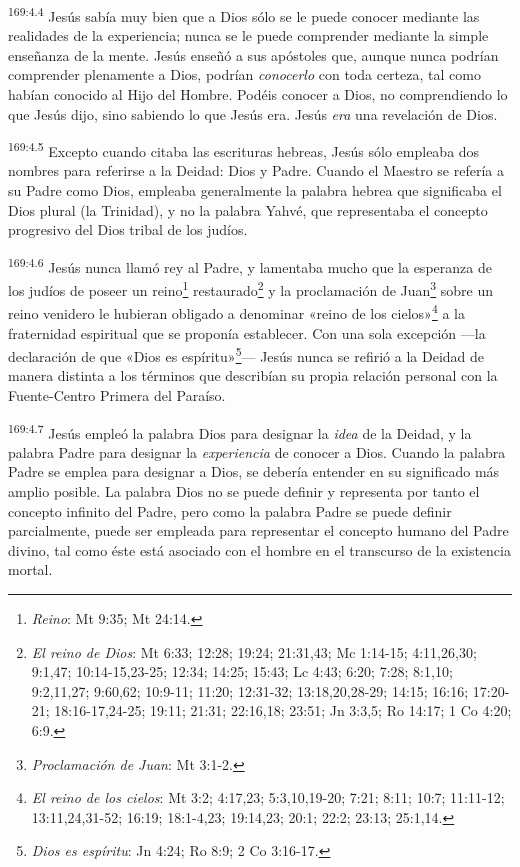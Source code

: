 \par
\textsuperscript{169:4.4} Jesús sabía muy bien que a Dios sólo se le puede conocer mediante las realidades de la experiencia; nunca se le puede comprender mediante la simple enseñanza de la mente. Jesús enseñó a sus apóstoles que, aunque nunca podrían comprender plenamente a Dios, podrían \textit{conocerlo} con toda certeza, tal como habían conocido al Hijo del Hombre. Podéis conocer a Dios, no comprendiendo lo que Jesús dijo, sino sabiendo lo que Jesús era. Jesús \textit{era} una revelación de Dios.

\par
\textsuperscript{169:4.5} Excepto cuando citaba las escrituras hebreas, Jesús sólo empleaba dos nombres para referirse a la Deidad: Dios y Padre. Cuando el Maestro se refería a su Padre como Dios, empleaba generalmente la palabra hebrea que significaba el Dios plural (la Trinidad), y no la palabra Yahvé, que representaba el concepto progresivo del Dios tribal de los judíos.

\par
\textsuperscript{169:4.6} Jesús nunca llamó rey al Padre, y lamentaba mucho que la esperanza de los judíos de poseer un reino\footnote{\textit{Reino}: Mt 9:35; Mt 24:14.} restaurado\footnote{\textit{El reino de Dios}: Mt 6:33; 12:28; 19:24; 21:31,43; Mc 1:14-15; 4:11,26,30; 9:1,47; 10:14-15,23-25; 12:34; 14:25; 15:43; Lc 4:43; 6:20; 7:28; 8:1,10; 9:2,11,27; 9:60,62; 10:9-11; 11:20; 12:31-32; 13:18,20,28-29; 14:15; 16:16; 17:20-21; 18:16-17,24-25; 19:11; 21:31; 22:16,18; 23:51; Jn 3:3,5; Ro 14:17; 1 Co 4:20; 6:9.} y la proclamación de Juan\footnote{\textit{Proclamación de Juan}: Mt 3:1-2.} sobre un reino venidero le hubieran obligado a denominar «reino de los cielos»\footnote{\textit{El reino de los cielos}: Mt 3:2; 4:17,23; 5:3,10,19-20; 7:21; 8:11; 10:7; 11:11-12; 13:11,24,31-52; 16:19; 18:1-4,23; 19:14,23; 20:1; 22:2; 23:13; 25:1,14.} a la fraternidad espiritual que se proponía establecer. Con una sola excepción ---la declaración de que «Dios es espíritu»\footnote{\textit{Dios es espíritu}: Jn 4:24; Ro 8:9; 2 Co 3:16-17.}--- Jesús nunca se refirió a la Deidad de manera distinta a los términos que describían su propia relación personal con la Fuente-Centro Primera del Paraíso.

\par
\textsuperscript{169:4.7} Jesús empleó la palabra Dios para designar la \textit{idea} de la Deidad, y la palabra Padre para designar la \textit{experiencia} de conocer a Dios. Cuando la palabra Padre se emplea para designar a Dios, se debería entender en su significado más amplio posible. La palabra Dios no se puede definir y representa por tanto el concepto infinito del Padre, pero como la palabra Padre se puede definir parcialmente, puede ser empleada para representar el concepto humano del Padre divino, tal como éste está asociado con el hombre en el transcurso de la existencia mortal.

